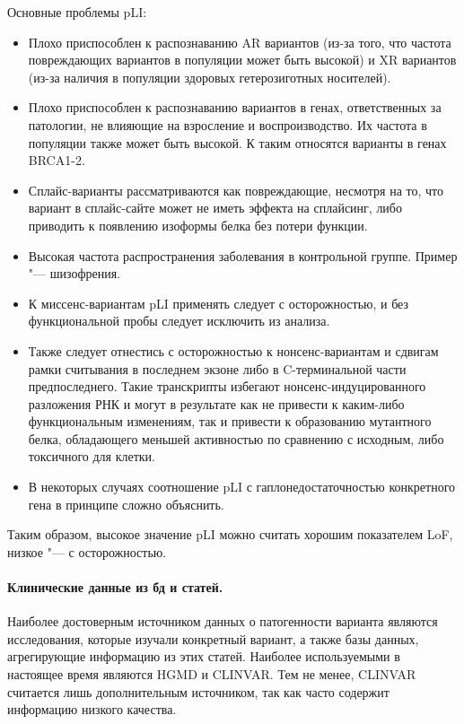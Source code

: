 \documentclass[a4paper,12pt]{article}
\begin{document}
Основные проблемы pLI\cite{ziegler}:

\begin{itemize}
\item Плохо приспособлен к распознаванию AR вариантов (из-за того, что частота повреждающих вариантов в популяции может быть высокой) и XR вариантов (из-за наличия в популяции здоровых гетерозиготных носителей).
\item Плохо приспособлен к распознаванию вариантов в генах, ответственных за патологии, не влияющие на взросление и воспроизводство.
Их частота в популяции также может быть высокой.
К таким относятся варианты в генах BRCA1-2.
\item Сплайс-варианты рассматриваются как повреждающие, несмотря на то, что вариант в сплайс-сайте может не иметь эффекта на сплайсинг, либо приводить к появлению изоформы белка без потери функции.
\item Высокая частота распространения заболевания в контрольной группе.
Пример "--- шизофрения.
\item К миссенс-вариантам pLI применять следует с осторожностью, и без функциональной пробы следует исключить из анализа.
\item Также следует отнестись с осторожностью к нонсенс-вариантам и сдвигам рамки считывания в последнем экзоне либо в C-терминальной части предпоследнего.
Такие транскрипты избегают нонсенс-индуцированного разложения РНК и могут в результате как не привести к каким-либо функциональным изменениям, так и привести к образованию мутантного белка, обладающего меньшей активностью по сравнению с исходным, либо токсичного для клетки.
\item В некоторых случаях соотношение pLI с гаплонедостаточностью конкретного гена в принципе сложно объяснить.
\end{itemize}

Таким образом, высокое значение pLI можно считать хорошим показателем LoF, низкое "--- с осторожностью.

\paragraph{Клинические данные из бд и статей.}
Наиболее достоверным источником данных о патогенности варианта являются исследования, которые изучали конкретный вариант, а также базы данных, агрегирующие информацию из этих статей.
Наиболее используемыми в настоящее время являются HGMD\cite{hgmd} и CLINVAR.
Тем не менее, CLINVAR считается лишь дополнительным источником, так как часто содержит информацию низкого качества\cite{ryzhkova}.
\end{document}
